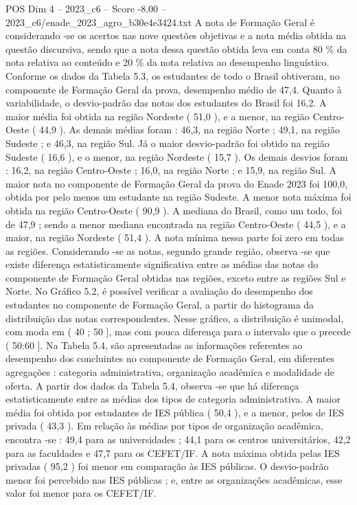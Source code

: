 \begin{textsample}{POS Dim 4 – 2023\_c6 – Score -8.00 – 2023\_c6/enade\_2023\_agro\_b30e4e3424.txt}
A nota de Formação Geral é considerando -se os acertos nas nove questões objetivas e a nota média obtida na questão discursiva, sendo que a nota dessa questão obtida leva em conta 80 \% da nota relativa ao conteúdo e 20 \% da nota relativa ao desempenho linguístico.
Conforme os dados da Tabela 5.3, os estudantes de todo o Brasil obtiveram, no componente de Formação Geral da prova, desempenho médio de 47,4.
Quanto à variabilidade, o desvio-padrão das notas dos estudantes do Brasil foi 16,2.
A maior média foi obtida na região Nordeste ( 51,0 ), e a menor, na região Centro-Oeste ( 44,9 ).
As demais médias foram : 46,3, na região Norte ; 49,1, na região Sudeste ; e 46,3, na região Sul.
Já o maior desvio-padrão foi obtido na região Sudeste ( 16,6 ), e o menor, na região Nordeste ( 15,7 ).
Os demais desvios foram : 16,2, na região Centro-Oeste ; 16,0, na região Norte ; e 15,9, na região Sul.
A maior nota no componente de Formação Geral da prova do Enade 2023 foi 100,0, obtida por pelo menos um estudante na região Sudeste.
A menor nota máxima foi obtida na região Centro-Oeste ( 90,9 ).
A mediana do Brasil, como um todo, foi de 47,9 ; sendo a menor mediana encontrada na região Centro-Oeste ( 44,5 ), e a maior, na região Nordeste ( 51,4 ).
A nota mínima nessa parte foi zero em todas as regiões.
Considerando -se as notas, segundo grande região, observa -se que existe diferença estatisticamente significativa entre as médias das notas do componente de Formação Geral obtidas nas regiões, exceto entre as regiões Sul e Norte.
No Gráfico 5.2, é possível verificar a avaliação do desempenho dos estudantes no componente de Formação Geral, a partir do histograma da distribuição das notas correspondentes.
Nesse gráfico, a distribuição é unimodal, com moda em ( 40 ; 50 ], mas com pouca diferença para o intervalo que o precede ( 50:60 ].
Na Tabela 5.4, são apresentadas as informações referentes ao desempenho dos concluintes no componente de Formação Geral, em diferentes agregações : categoria administrativa, organização acadêmica e modalidade de oferta.
A partir dos dados da Tabela 5.4, observa -se que há diferença estatisticamente entre as médias dos tipos de categoria administrativa.
A maior média foi obtida por estudantes de IES pública ( 50,4 ), e a menor, pelos de IES privada ( 43,3 ).
Em relação às médias por tipos de organização acadêmica, encontra -se : 49,4 para as universidades ; 44,1 para os centros universitários, 42,2 para as faculdades e 47,7 para os CEFET/IF.
A nota máxima obtida pelas IES privadas ( 95,2 ) foi menor em comparação às IES públicas.
O desvio-padrão menor foi percebido nas IES públicas ; e, entre as organizações acadêmicas, esse valor foi menor para os CEFET/IF.

\end{textsample}
